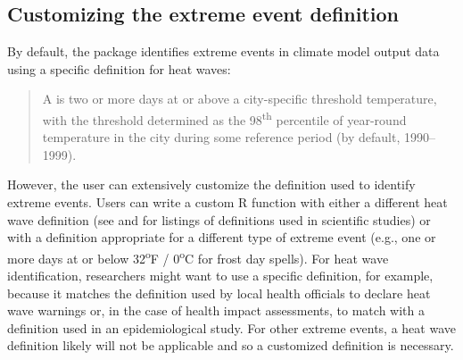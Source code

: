 \subsection{Customizing the extreme event
definition}\label{customizing-the-extreme-event-definition}

By default, the package identifies extreme events in climate model
output data using a specific definition for heat waves:

\begin{quote}
A  is two or more days at or above a city-specific
threshold temperature, with the threshold determined as the
98\textsuperscript{th} percentile of year-round temperature in the city
during some reference period (by default, 1990--1999).
\end{quote}

\noindent However, the user can extensively customize the definition
used to identify extreme events. Users can write a custom R function
with either a different heat wave definition (see \citet{smith2013heat}
and \citet{kent2014heat} for listings of definitions used in scientific
studies) or with a definition appropriate for a different type of
extreme event (e.g., one or more days at or below 32\textsuperscript{o}F
/ 0\textsuperscript{o}C for frost day spells). For heat wave
identification, researchers might want to use a specific definition, for
example, because it matches the definition used by local health
officials to declare heat wave warnings or, in the case of health impact
assessments, to match with a definition used in an epidemiological
study. For other extreme events, a heat wave definition likely will not
be applicable and so a customized definition is necessary.

